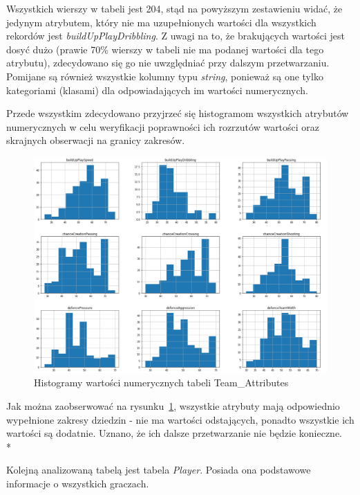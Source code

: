     \noindent Wszystkich wierszy w tabeli jest 204, stąd na powyższym zestawieniu widać, że jedynym atrybutem, który nie ma uzupełnionych wartości dla wszystkich rekordów jest \emph{buildUpPlayDribbling}. Z uwagi na to, że brakujących wartości jest dosyć dużo (prawie 70\% wierszy w tabeli nie ma podanej wartości dla tego atrybutu), zdecydowano się go nie uwzględniać przy dalszym przetwarzaniu. Pomijane są również wszystkie kolumny typu \emph{string}, ponieważ są one tylko kategoriami (klasami) dla odpowiadających im wartości numerycznych.
    
    Przede wszystkim zdecydowano  przyjrzeć się histogramom wszystkich atrybutów numerycznych w celu weryfikacji poprawności ich rozrzutów wartości oraz skrajnych obserwacji na granicy zakresów.
    
    \begin{figure}[H] 
        \centering\includegraphics[width=\textwidth]{figures/team_attributes.png}
        \caption{Histogramy wartości numerycznych tabeli Team\_Attributes}
        \label{fig:team_attributes}
    \end{figure}
    
    \noindent Jak można zaobserwować na rysunku~\ref{fig:team_attributes}, wszystkie atrybuty mają odpowiednio wypełnione zakresy dziedzin - nie ma wartości odstających, ponadto wszystkie ich wartości są dodatnie. Uznano, że ich  dalsze przetwarzanie nie będzie konieczne.\\*
    
    \noindent Kolejną analizowaną tabelą jest tabela \emph{Player}. Posiada ona podstawowe informacje o wszystkich graczach.
    
